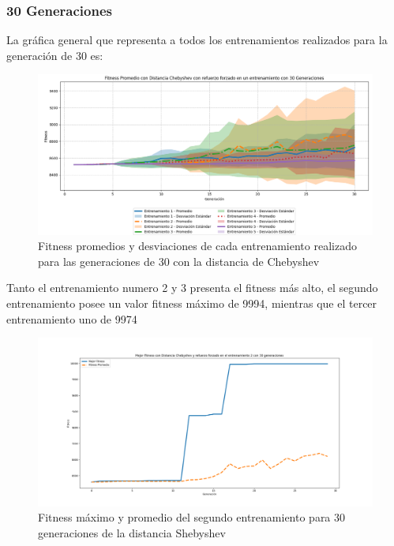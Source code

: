 \documentclass[conference]{IEEEtran}
\begin{document}
\subsubsection{30 Generaciones}
La gráfica general que representa a todos los entrenamientos realizados para la generación de 30 es:
\begin{figure}[H]
    \centering
    \includegraphics[width=1\linewidth]{Chebyshev/Fitness_Acumulado_Cheby30Gen.png}
    \caption{Fitness promedios y desviaciones de cada entrenamiento realizado para las generaciones de 30 con la distancia de Chebyshev}
    \label{fig:genral_che_30}
\end{figure}
Tanto el entrenamiento numero 2 y 3 presenta el fitness más alto, el segundo entrenamiento posee un valor fitness máximo de 9994, mientras que el tercer entrenamiento uno de 9974
\begin{figure}[H]
    \centering
    \includegraphics[width=0.99\linewidth]{Chebyshev/Fitness_Individual_30Gen/Fitness_2_Cheby_30Gen.png}
    \caption{Fitness máximo y promedio del segundo entrenamiento para 30 generaciones de la distancia Shebyshev}
    \label{fig:en:she_2}
\end{figure}
\end{document}
